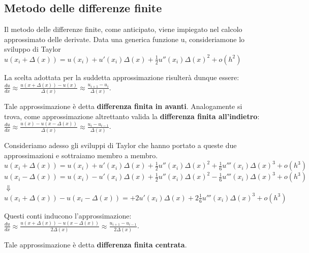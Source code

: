 \subsection{Metodo delle differenze finite}
Il metodo delle differenze finite, come anticipato, viene impiegato nel calcolo approssimato delle derivate. Data una generica funzione u, consideriamone lo sviluppo di Taylor\\
\vspace{0.25em}
\centering
$u(x_i+\Delta(x))=u(x_i)+u'(x_i)\Delta(x)+\frac{1}{2}u''(x_i)\Delta(x)^2+o(h^2)$ \\
\vspace{0.25em}
\raggedright
La scelta adottata per la suddetta approssimazione risulterà dunque essere:\\
\vspace{0.25em}
\centering 
$\frac{du}{dx}\approx\frac{u(x+\Delta(x))-u(x)}{\Delta(x)} \approx \frac{u_{i+1} - u_i}{\Delta(x)} $.
\cite{FD}\\
\vspace{0.25em}
\raggedright
Tale approssimazione è detta \textbf{differenza finita in avanti}. Analogamente si trova, come approssimazione altrettanto valida la \textbf{differenza finita all'indietro}:\\
\vspace{0.25em}
\centering 
$\frac{du}{dx}\approx\frac{u(x)-u(x-\Delta(x))}{\Delta(x)} \approx \frac{u_i - u_{i-1}}{\Delta(x)} $.\\
\vspace{0.25em}
\raggedright
Consideriamo adesso gli sviluppi di Taylor che hanno portato a queste due approssimazioni e sottraiamo membro a membro.\\
\vspace{0.25em}
\centering
$u(x_i+\Delta(x))=u(x_i)+u'(x_i)\Delta(x)+\frac{1}{2}u''(x_i)\Delta(x)^2+\frac{1}{6}u'''(x_i)\Delta(x)^3+o(h^3)$ \\
\vspace{0.25em}
$u(x_i-\Delta(x))=u(x_i)-u'(x_i)\Delta(x)+\frac{1}{2}u''(x_i)\Delta(x)^2-\frac{1}{6}u'''(x_i)\Delta(x)^3+o(h^3)$ \\
$\Downarrow$\\
$u(x_i+\Delta(x))-u(x_i-\Delta(x))=+2u'(x_i)\Delta(x)+2\frac{1}{6}u'''(x_i)\Delta(x)^3+o(h^3)$ \\
\vspace{0.25em}
\raggedright
\newpage
Questi conti inducono l'approssimazione:\\
\vspace{0.25em}
\centering 
$\frac{du}{dx}\approx\frac{u(x+\Delta(x))-u(x-\Delta(x))}{2\Delta(x)} \approx \frac{u_{i+1} - u_{i-1}}{2\Delta(x)}$.\\
\vspace{0.25em}
\raggedright
Tale approssimazione è detta \textbf{differenza finita centrata}.


